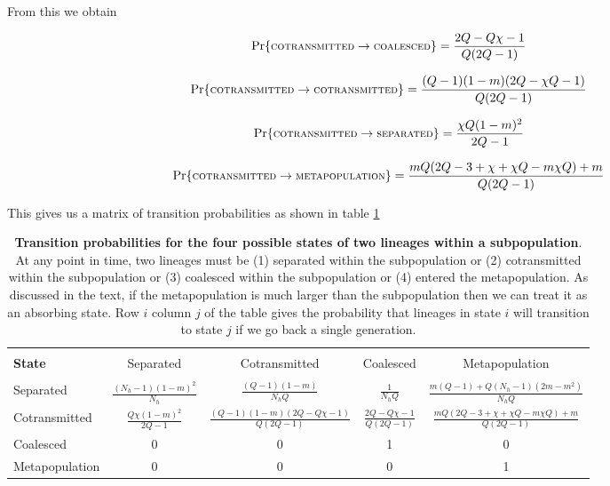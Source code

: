 \documentclass[_main.tex]{subfiles}
\begin{document}
\noindent From this we obtain

\begin{equation*}
\Pr \{ \textsc{\small{cotransmitted}} \rightarrow \textsc{\small{coalesced}} \} 
= \frac{2Q - Q \chi - 1}{Q(2Q-1)} 
\end{equation*}

\begin{equation*}
\Pr \{ \textsc{\small{cotransmitted}} \rightarrow \textsc{\small{cotransmitted}} \} 
= \frac{(Q-1)(1-m)(2Q - \chi Q - 1)}{Q(2Q-1)}
\end{equation*}

\begin{equation*}
\Pr \{ \textsc{\small{cotransmitted}} \rightarrow \textsc{\small{separated}} \} 
= \frac{\chi Q (1-m)^2}{2Q-1}
\end{equation*}

\begin{equation*}
\Pr \{ \textsc{\small{cotransmitted}} \rightarrow \textsc{\small{metapopulation}} \} 
= \frac{mQ(2Q - 3 + \chi + \chi Q - m \chi Q) + m}{Q(2Q-1)} 
\end{equation*}

\noindent This gives us a matrix of transition probabilities as shown in table \ref{tab:tr_matrix_subpopulation}



\renewcommand\theadalign{bc} 

\begin{table}[h!] 
\centering
\large{
\begin{tabular}{l | c c c c } 
\hline \\
\textbf{\small{State}} & 
\small{Separated} & 
\small{Cotransmitted} & 
\small{Coalesced} & 
\small{Metapopulation}\\ [0.5ex] 
\hline \\
\small{Separated} & 
$\frac{(N_h - 1)(1-m)^2}{N_h}$ & 
$\frac{(Q -1)(1-m)}{N_h Q}$ &
$\frac{1}{N_h Q}$ &
$\frac{m(Q-1) + Q (N_h-1)(2m - m^2)}{N_h Q}$ \\ [2ex]
\small{Cotransmitted} &
$\frac{Q \chi (1-m)^2}{2Q-1}$ &
$\frac{(Q-1)(1-m)(2Q - Q \chi - 1)}{Q(2Q-1)}$ &
$\frac{2Q - Q \chi - 1}{Q(2Q-1)}$ &
$\frac{mQ(2Q - 3 + \chi + \chi Q - m \chi Q) + m}{Q(2Q-1)}$  \\ [2ex] 
\small{Coalesced} & 0 & 0 & 1 & 0 \\ [2ex] 
\small{Metapopulation} & 0 & 0 & 0 & 1 \\ [2ex] 
\end{tabular}
}
\caption{\small{\textbf{Transition probabilities for the four possible states of two lineages within a subpopulation}. At any point in time, two lineages must be (1) separated within the subpopulation or (2) cotransmitted within the subpopulation or (3) coalesced within the subpopulation or (4) entered the metapopulation. As discussed in the text, if the metapopulation is much larger than the subpopulation then we can treat it as an absorbing state.  Row $i$ column $j$ of the table gives the probability that lineages in state $i$ will transition to state $j$ if we go back a single generation.}}
\label{tab:tr_matrix_subpopulation}
\end{table}
\end{document}
